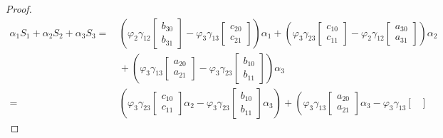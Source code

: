 \documentclass[reqno]{amsart}
\numberwithin{equation}{section}
\theoremstyle{definition}
\begin{document}
\begin{proof}
\begin{equation}\label{alpha1S+alpha2S+alpha3S computation}
    \begin{aligned}
     \alpha_1S_1 + \alpha_2S_2+\alpha_3S_3 =&
\,\left(\varphi_2\gamma_{12}\begin{bmatrix}
                 b_{30}\\
                 b_{31}
             \end{bmatrix}
             -\varphi_3\gamma_{13}\begin{bmatrix}
                 c_{20}\\
                 c_{21}
             \end{bmatrix}\right) \alpha_1
+\left(\varphi_3\gamma_{23}\begin{bmatrix}
                 c_{10}\\
                 c_{11}
             \end{bmatrix}
             -\varphi_2\gamma_{12}\begin{bmatrix}
                 a_{30}\\
                 a_{31}
             \end{bmatrix}\right)\alpha_2\\[1ex] 
&\,+\left(\varphi_3\gamma_{13}\begin{bmatrix}
                 a_{20}\\
                 a_{21}
             \end{bmatrix}
             -\varphi_3\gamma_{23}\begin{bmatrix}
                 b_{10}\\
                 b_{11}
             \end{bmatrix}\right)\alpha_3\\[1ex]         
=&\,\left(
\varphi_3\gamma_{23}\begin{bmatrix}
                 c_{10}\\
                 c_{11}
             \end{bmatrix}\alpha_2 -
             \varphi_3\gamma_{23}\begin{bmatrix}
                 b_{10}\\
                 b_{11}
             \end{bmatrix} \alpha_3
\right)+
\left(
\varphi_3\gamma_{13}\begin{bmatrix}
                 a_{20}\\
                 a_{21}
             \end{bmatrix}\alpha_3
             -\varphi_3\gamma_{13}\begin{bmatrix}

\end{bmatrix}
\end{aligned}
\end{equation}
\end{proof}
\end{document}
